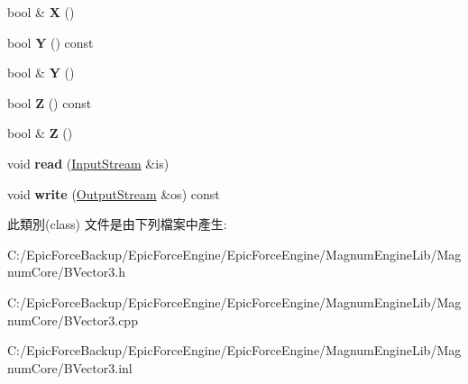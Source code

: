 \begin{DoxyCompactItemize}
\item 
bool \& {\bfseries X} ()\hypertarget{class_magnum_1_1_b_vector3_aef74d519d566781ecf16731ec780ced9}{}\label{class_magnum_1_1_b_vector3_aef74d519d566781ecf16731ec780ced9}

\item 
bool {\bfseries Y} () const \hypertarget{class_magnum_1_1_b_vector3_aea5746f818fe0726930c460e97bbcc15}{}\label{class_magnum_1_1_b_vector3_aea5746f818fe0726930c460e97bbcc15}

\item 
bool \& {\bfseries Y} ()\hypertarget{class_magnum_1_1_b_vector3_a5cc7a74a003b0d9a5c3c40f880d631ff}{}\label{class_magnum_1_1_b_vector3_a5cc7a74a003b0d9a5c3c40f880d631ff}

\item 
bool {\bfseries Z} () const \hypertarget{class_magnum_1_1_b_vector3_a3de892989123b34170038c6ce82ebb86}{}\label{class_magnum_1_1_b_vector3_a3de892989123b34170038c6ce82ebb86}

\item 
bool \& {\bfseries Z} ()\hypertarget{class_magnum_1_1_b_vector3_af88f472bcfaf97be0287bdd5cb014824}{}\label{class_magnum_1_1_b_vector3_af88f472bcfaf97be0287bdd5cb014824}

\item 
void {\bfseries read} (\hyperlink{class_magnum_1_1_input_stream}{Input\+Stream} \&is)\hypertarget{class_magnum_1_1_b_vector3_a8881ec8b7da37b0bfc59bf130bc4e447}{}\label{class_magnum_1_1_b_vector3_a8881ec8b7da37b0bfc59bf130bc4e447}

\item 
void {\bfseries write} (\hyperlink{class_magnum_1_1_output_stream}{Output\+Stream} \&os) const \hypertarget{class_magnum_1_1_b_vector3_a22885a622520182cacc957cb004d6bbe}{}\label{class_magnum_1_1_b_vector3_a22885a622520182cacc957cb004d6bbe}

\end{DoxyCompactItemize}


此類別(class) 文件是由下列檔案中產生\+:\begin{DoxyCompactItemize}
\item 
C\+:/\+Epic\+Force\+Backup/\+Epic\+Force\+Engine/\+Epic\+Force\+Engine/\+Magnum\+Engine\+Lib/\+Magnum\+Core/B\+Vector3.\+h\item 
C\+:/\+Epic\+Force\+Backup/\+Epic\+Force\+Engine/\+Epic\+Force\+Engine/\+Magnum\+Engine\+Lib/\+Magnum\+Core/B\+Vector3.\+cpp\item 
C\+:/\+Epic\+Force\+Backup/\+Epic\+Force\+Engine/\+Epic\+Force\+Engine/\+Magnum\+Engine\+Lib/\+Magnum\+Core/B\+Vector3.\+inl\end{DoxyCompactItemize}

